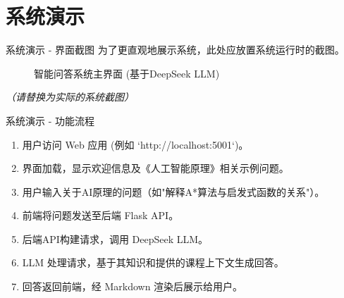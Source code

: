 \documentclass{beamer}
\begin{document}
\section{系统演示}
\begin{frame}{系统演示 - 界面截图}
  为了更直观地展示系统，此处应放置系统运行时的截图。
  \begin{figure}
    \centering
    \caption{智能问答系统主界面 (基于DeepSeek LLM)}
  \end{figure}
  \textit{（请替换为实际的系统截图）}
\end{frame}

\begin{frame}{系统演示 - 功能流程}
  \begin{enumerate}
    \item 用户访问 Web 应用 (例如 `http://localhost:5001`)。
    \item 界面加载，显示欢迎信息及《人工智能原理》相关示例问题。
    \item 用户输入关于AI原理的问题（如"解释A*算法与启发式函数的关系"）。
    \item 前端将问题发送至后端 Flask API。
    \item 后端API构建请求，调用 DeepSeek LLM。
    \item LLM 处理请求，基于其知识和提供的课程上下文生成回答。
    \item 回答返回前端，经 Markdown 渲染后展示给用户。
  \end{enumerate}
\end{frame}

\end{document}
